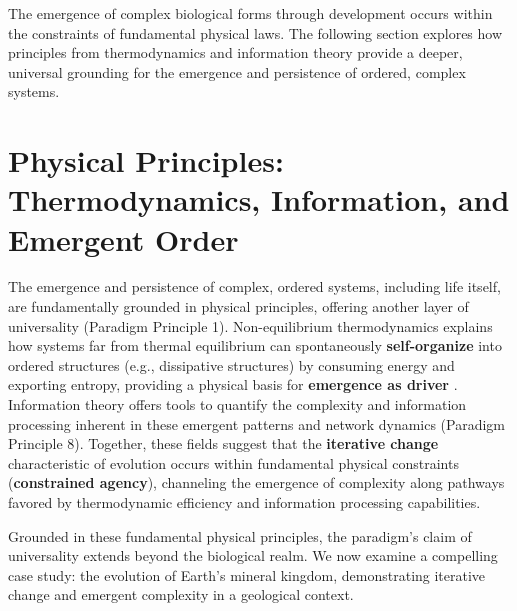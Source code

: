 \documentclass[12pt,openany]{book}
\begin{document}
The emergence of complex biological forms through development occurs within the constraints of fundamental physical laws. The following section explores how principles from thermodynamics and information theory provide a deeper, universal grounding for the emergence and persistence of ordered, complex systems.

\section{Physical Principles: Thermodynamics, Information, and Emergent Order} \label{sec:thermoinfo}
The emergence and persistence of complex, ordered systems, including life itself, are fundamentally grounded in physical principles, offering another layer of universality (Paradigm Principle 1). Non-equilibrium thermodynamics explains how systems far from thermal equilibrium can spontaneously \textbf{self-organize} into ordered structures (e.g., dissipative structures) by consuming energy and exporting entropy, providing a physical basis for \textbf{emergence as driver} \citep{ThermoComplexitySource}. Information theory offers tools to quantify the complexity and information processing inherent in these emergent patterns and network dynamics (Paradigm Principle 8). Together, these fields suggest that the \textbf{iterative change} characteristic of evolution occurs within fundamental physical constraints (\textbf{constrained agency}), channeling the emergence of complexity along pathways favored by thermodynamic efficiency and information processing capabilities.

Grounded in these fundamental physical principles, the paradigm's claim of universality extends beyond the biological realm. We now examine a compelling case study: the evolution of Earth's mineral kingdom, demonstrating iterative change and emergent complexity in a geological context.

\end{document}
